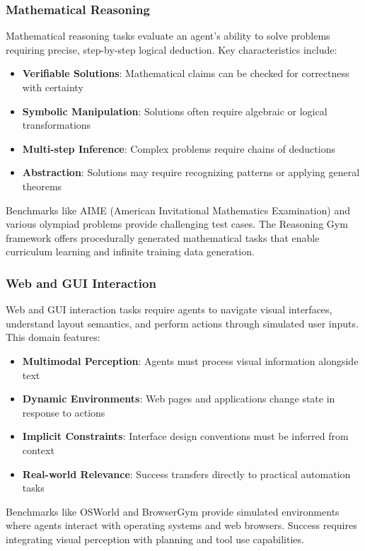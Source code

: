\subsubsection{Mathematical Reasoning}

Mathematical reasoning tasks evaluate an agent's ability to solve problems requiring precise, step-by-step logical deduction. Key characteristics include:

\begin{itemize}
    \item \textbf{Verifiable Solutions}: Mathematical claims can be checked for correctness with certainty
    \item \textbf{Symbolic Manipulation}: Solutions often require algebraic or logical transformations
    \item \textbf{Multi-step Inference}: Complex problems require chains of deductions
    \item \textbf{Abstraction}: Solutions may require recognizing patterns or applying general theorems

\end{itemize}
Benchmarks like AIME (American Invitational Mathematics Examination) and various olympiad problems provide challenging test cases. The Reasoning Gym framework offers procedurally generated mathematical tasks that enable curriculum learning and infinite training data generation.

\subsubsection{Web and GUI Interaction}

Web and GUI interaction tasks require agents to navigate visual interfaces, understand layout semantics, and perform actions through simulated user inputs. This domain features:

\begin{itemize}
    \item \textbf{Multimodal Perception}: Agents must process visual information alongside text
    \item \textbf{Dynamic Environments}: Web pages and applications change state in response to actions
    \item \textbf{Implicit Constraints}: Interface design conventions must be inferred from context
    \item \textbf{Real-world Relevance}: Success transfers directly to practical automation tasks

\end{itemize}
Benchmarks like OSWorld and BrowserGym provide simulated environments where agents interact with operating systems and web browsers. Success requires integrating visual perception with planning and tool use capabilities.

